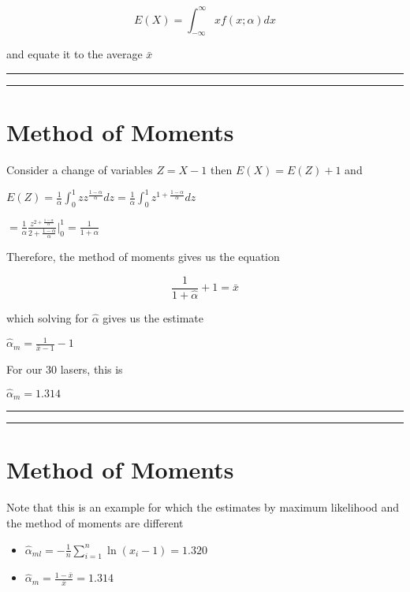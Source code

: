 \documentclass[
]{book}
\begin{document}
\[E(X)=\int_{-\infty}^{\infty} x f(x;\alpha)dx\]

and equate it to the average \(\bar{x}\)

\begin{center}\rule{0.5\linewidth}{0.5pt}\end{center}

\begin{center}\rule{0.5\linewidth}{0.5pt}\end{center}

\hypertarget{method-of-moments-9}{%
\section{Method of Moments}\label{method-of-moments-9}}

Consider a change of variables \(Z=X-1\) then \(E(X)=E(Z)+1\) and

\(E(Z)= \frac{1}{\alpha} \int_0^1 z z^{\frac{1-\alpha}{\alpha}}dz= \frac{1}{\alpha} \int_0^1 z^{1+\frac{1-\alpha}{\alpha}}dz\)

\(= \frac{1}{\alpha} \frac{z^{2+\frac{1-\alpha}{\alpha}}}{{2+\frac{1-\alpha}{\alpha}}} |_0^1=\frac{1}{1+\alpha}\)

Therefore, the method of moments gives us the equation

\[\frac{1}{1+\hat{\alpha}}+1=\bar{x}\]

which solving for \(\hat{\alpha}\) gives us the estimate

\(\hat{\alpha}_m=\frac{1}{\bar{x}-1}-1\)

For our 30 lasers, this is

\(\hat{\alpha}_m=1.314\)

\begin{center}\rule{0.5\linewidth}{0.5pt}\end{center}

\begin{center}\rule{0.5\linewidth}{0.5pt}\end{center}

\hypertarget{method-of-moments-10}{%
\section{Method of Moments}\label{method-of-moments-10}}

Note that this is an example for which the estimates by maximum likelihood and the method of moments are different

\begin{itemize}
\item
  \(\hat{\alpha}_{ml}=-\frac{1}{n}\sum_{i=1}^n \ln (x_i-1)=1.320\)
\item
  \(\hat{\alpha}_m=\frac{1-\bar{x}}{\bar{x}}=1.314\)
\end{itemize}
\end{document}
